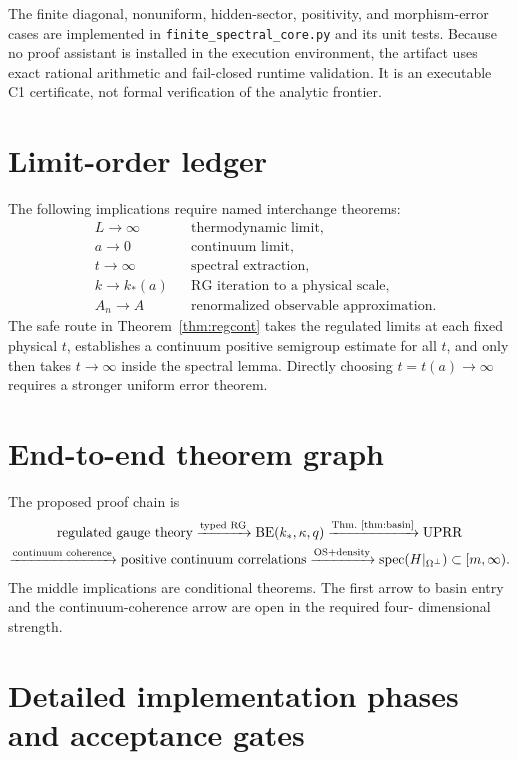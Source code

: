 \documentclass[11pt]{article}
\newcommand{\spec}{\operatorname{spec}}
\theoremstyle{remark}
\begin{document}
The finite diagonal, nonuniform, hidden-sector, positivity, and morphism-error
cases are implemented in \texttt{finite\_spectral\_core.py} and its unit tests.
Because no proof assistant is installed in the execution environment, the
artifact uses exact rational arithmetic and fail-closed runtime validation.
It is an executable C1 certificate, not formal verification of the analytic
frontier.

\section{Limit-order ledger}

The following implications require named interchange theorems:
\begin{align*}
 &L\to\infty &&\text{thermodynamic limit},\\
 &a\to0 &&\text{continuum limit},\\
 &t\to\infty &&\text{spectral extraction},\\
 &k\to k_*(a) &&\text{RG iteration to a physical scale},\\
 &A_n\to A &&\text{renormalized observable approximation}.
\end{align*}
The safe route in Theorem~\ref{thm:regcont} takes the regulated limits at each
fixed physical $t$, establishes a continuum positive semigroup estimate for
all $t$, and only then takes $t\to\infty$ inside the spectral lemma.  Directly
choosing $t=t(a)\to\infty$ requires a stronger uniform error theorem.

\section{End-to-end theorem graph}

The proposed proof chain is
\[
\begin{gathered}
 \text{regulated gauge theory}
 \xrightarrow{\text{typed RG}}
 \mathrm{BE}(k_*,\kappa,q)
 \xrightarrow{\text{Thm.~\ref{thm:basin}}}
 \text{UPRR}
 \\
 \xrightarrow{\text{continuum coherence}}
 \text{positive continuum correlations}
 \xrightarrow{\text{OS+density}}
 \spec(H|_{\Omega^\perp})\subset[m,\infty).
\end{gathered}
\]
The middle implications are conditional theorems.  The first arrow to basin
entry and the continuum-coherence arrow are open in the required four-
dimensional strength.

\section{Detailed implementation phases and acceptance gates}
\end{document}
